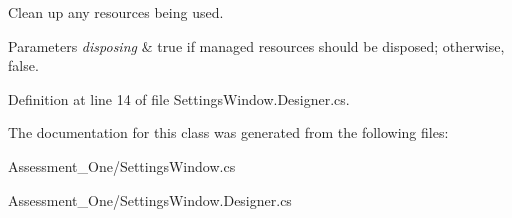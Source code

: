 Clean up any resources being used. 


\begin{DoxyParams}{Parameters}
{\em disposing} & true if managed resources should be disposed; otherwise, false.\\
\hline
\end{DoxyParams}


Definition at line 14 of file SettingsWindow.Designer.cs.



The documentation for this class was generated from the following files:\begin{DoxyCompactItemize}
\item 
Assessment\_\-One/SettingsWindow.cs\item 
Assessment\_\-One/SettingsWindow.Designer.cs\end{DoxyCompactItemize}
